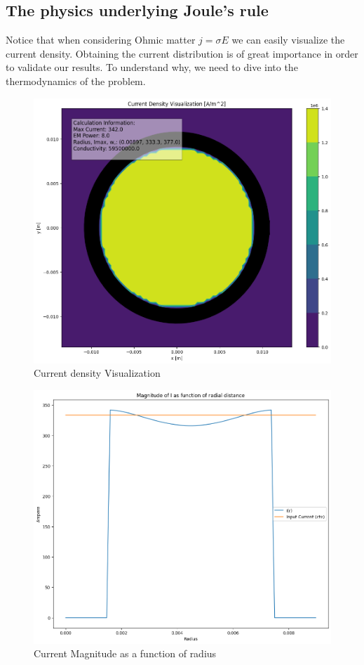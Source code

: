 \subsection{The physics underlying Joule's rule}
Notice that when considering Ohmic matter $j = \sigma E$ we can easily visualize the current density. Obtaining the current distribution is of great importance in order to validate our results. To understand why, we need to dive into the thermodynamics of the problem. \\
\begin{figure}[H]
    \centering
    \includegraphics[scale=0.35]{Figures/current-density-cable.png}
    \caption{Current density Visualization}
    \label{fig:current-color}
\end{figure}
\begin{figure}[H]
    \centering
    \includegraphics[scale=0.35]{Figures/magnitude-current-radius.png}
    \caption{Current Magnitude as a function of radius}
    \label{fig:current-color}
\end{figure}


